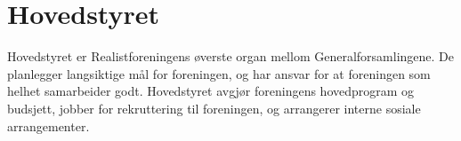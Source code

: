 \chapter{Hovedstyret}
Hovedstyret er Realistforeningens øverste organ mellom Generalforsamlingene.
De planlegger langsiktige mål for foreningen, og har ansvar for at
foreningen som helhet samarbeider godt. Hovedstyret avgjør foreningens
hovedprogram og budsjett, jobber for rekruttering til foreningen, og
arrangerer interne sosiale arrangementer.
% 
% 


